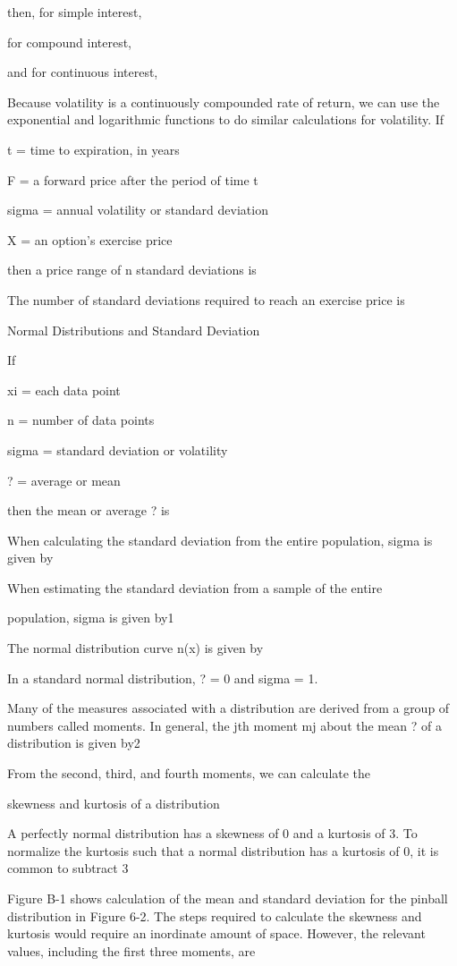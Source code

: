 then, for simple interest,\par
for compound interest,\par
and for continuous interest,\par
Because volatility is a continuously compounded rate of return, we can use the exponential and logarithmic functions to do similar calculations for volatility. If\par
\noindent t = time to expiration, in years\par

\noindent F = a forward price after the period of time t\par
\noindent sigma = annual volatility or standard deviation\par
\noindent X = an option's exercise price\par
\noindent then a price range of n standard deviations is\par
The number of standard deviations required to reach an exercise price is\par
\noindent Normal Distributions and Standard Deviation\par
\noindent If\par
\noindent xi = each data point\par
\noindent n = number of data points\par
\noindent sigma = standard deviation or volatility\par
\noindent ? = average or mean\par
\noindent then the mean or average ? is\par
When calculating the standard deviation from the entire population, sigma is given by\par
When estimating the standard deviation from a sample of the entire\par
\noindent population, sigma is given by1\par

\noindent The normal distribution curve n(x) is given by\par
In a standard normal distribution, ? = 0 and sigma = 1.\par
Many of the measures associated with a distribution are derived from a group of numbers called moments. In general, the jth moment mj about the mean ? of a distribution is given by2\par
From the second, third, and fourth moments, we can calculate the\par
\noindent skewness and kurtosis of a distribution\par
A perfectly normal distribution has a skewness of 0 and a kurtosis of 3. To normalize the kurtosis such that a normal distribution has a kurtosis of 0, it is common to subtract 3\par
Figure B-1 shows calculation of the mean and standard deviation for the pinball distribution in Figure 6-2. The steps required to calculate the skewness and kurtosis would require an inordinate amount of space. However, the relevant values, including the first three moments, are\par

